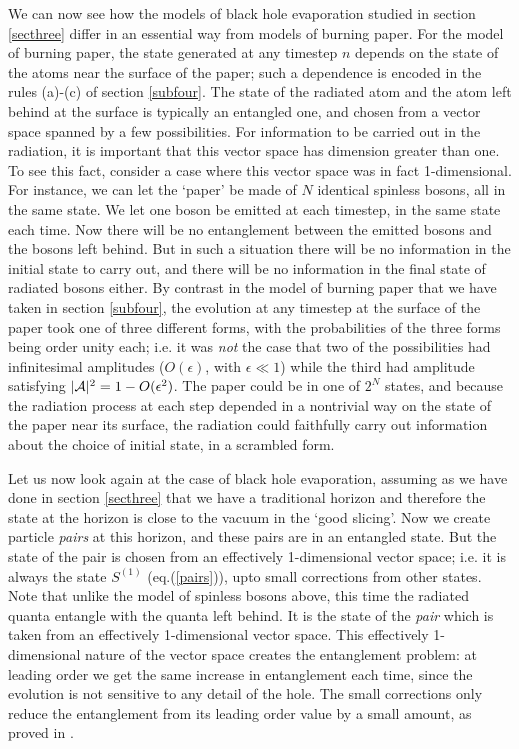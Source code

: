 \documentclass[12pt]{article}
\begin{document}
We can now see how the models of black hole evaporation studied in section \ref{secthree} differ in an essential way from models of burning paper. For the model of burning paper, the state generated at any timestep $n$ depends on the state of the atoms near the surface of the paper; such a dependence is encoded in the rules (a)-(c) of section \ref{subfour}. The state of the radiated atom and the atom left behind at the surface is typically an entangled one, and chosen  from  a vector space spanned by a few possibilities. For information to be carried out in the radiation, it is important that this vector space has dimension greater than one. To see this fact, consider a case where this vector space was in fact 1-dimensional. For instance, we can let the `paper' be made of $N$ identical spinless bosons, all in the same state.  We let one boson be emitted at each timestep, in the same state each time. Now there will be no entanglement between the emitted bosons and the bosons left behind. But in such a situation there will be no information in the initial state to carry out, and there will be no information in the final state of radiated bosons either. By contrast in the model of burning paper that we have taken in section \ref{subfour}, the evolution at any timestep at the surface of the paper took one of three different forms, with the probabilities of the three forms being order unity each; i.e. it was {\it not} the case that two of the possibilities had infinitesimal amplitudes ($O(\epsilon)$, with $\epsilon\ll 1$) while the third had amplitude satisfying $|{\cal A}|^2=1-O(\epsilon^2)$. The paper could be in one of $2^N$ states, and because the radiation process at each step depended in a nontrivial way on the state of the paper near its surface, the radiation could faithfully carry out information about the choice of initial state, in a scrambled form.





Let us now look again at the case of black hole evaporation, assuming as we have done in section \ref{secthree} that we have a traditional horizon and therefore the state at the horizon is close to the vacuum in the `good slicing'. Now we create particle {\it pairs} at this horizon, and these pairs are in an entangled state. But the state of the pair is chosen from an effectively 1-dimensional vector space; i.e. it is always the state $S^{(1)}$ (eq.(\ref{pairs})), upto small corrections from other states. Note that unlike the model of spinless bosons above, this time the radiated quanta entangle with the quanta left behind. It is the state of the {\it pair} which is taken from an effectively 1-dimensional vector space. This effectively  1-dimensional nature of the vector space  creates the entanglement problem: at leading order we get the same increase in entanglement each time, since the evolution is not sensitive to any detail of the hole. The small corrections only reduce the entanglement from its leading order value by a small amount, as proved in \cite{mathurfuzz}. 
\end{document}
